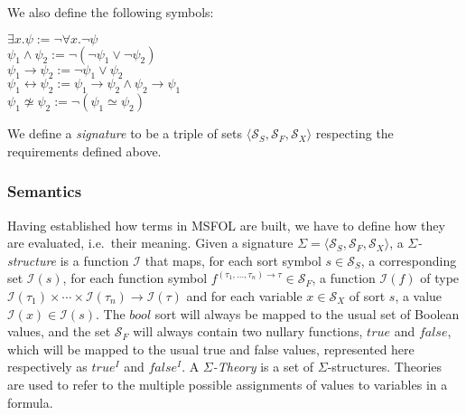 We also define the following symbols:

\begin{center}
  $\exists x. \psi := \neg \forall x. \neg \psi$\\
  $\psi_{1} \wedge \psi_{2} := \neg (\neg \psi_{1} \vee \neg \psi_{2})$\\
  $\psi_{1} \rightarrow \psi_{2} := \neg \psi_{1} \vee \psi_{2}$\\
  $\psi_{1} \leftrightarrow \psi_{2} := \psi_{1} \rightarrow \psi_{2} \wedge \psi_{2} \rightarrow \psi_{1}$\\
  $\psi_{1} \not\simeq \psi_{2} := \neg (\psi_{1} \simeq \psi_{2})$
\end{center}

We define a \textit{signature} to be a triple of sets $\langle \mathcal{S}_{S}, \mathcal{S}_{F}, \mathcal{S}_{X} \rangle$ respecting the requirements defined above.

\subsubsection{Semantics}

Having established how terms in MSFOL are built, we have to define how they are evaluated, i.e.\ their meaning.
Given a signature $\Sigma = \langle \mathcal{S}_{S}, \mathcal{S}_{F}, \mathcal{S}_{X} \rangle$, a $\Sigma$\textit{-structure} is a function $\mathcal{I}$ that maps, for each sort symbol $s \in \mathcal{S}_{S}$, a corresponding set $\mathcal{I}(s)$, for each function symbol $f^{(\tau_{1}, \ldots, \tau_{n}) \rightarrow \tau} \in \mathcal{S}_{F}$, a function $\mathcal{I}(f)$ of type $\mathcal{I}(\tau_{1}) \times \cdots \times \mathcal{I}(\tau_{n}) \rightarrow \mathcal{I}(\tau)$ and for each variable $x \in \mathcal{S}_{X}$ of sort $s$, a value $\mathcal{I}(x) \in \mathcal{I}(s)$.
The $\textit{bool}$ sort will always be mapped to the usual set of Boolean values, and the set $\mathcal{S}_{F}$ will always contain two nullary functions, $\textit{true}$ and $\textit{false}$, which will be mapped to the usual true and false values, represented here respectively as $true^{I}$ and $false^{I}$.
A $\Sigma$\textit{-Theory} is a set of $\Sigma$-structures. Theories are used to refer to the multiple possible assignments
of values to variables in a formula.


